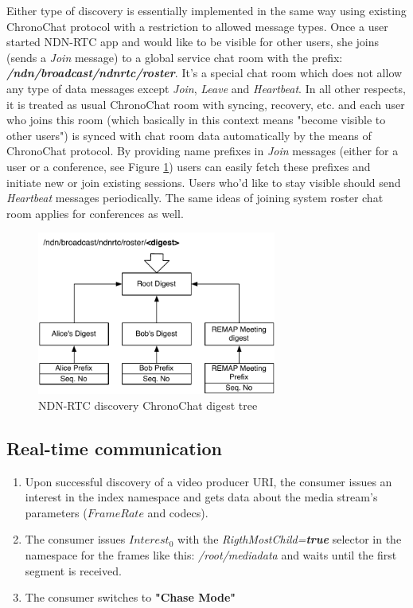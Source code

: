 \documentclass[12pt]{article}
\begin{document}
Either type of discovery is essentially implemented in the same way using existing ChronoChat protocol with a restriction to allowed message types. Once a user started NDN-RTC app and would like to be visible for other users, she joins (sends a \textit{Join} message) to a global service chat room with the prefix: \textbf{\textit{/ndn/broadcast/ndnrtc/roster}}. It's a special chat room which does not allow any type of data messages except \textit{Join}, \textit{Leave} and \textit{Heartbeat}. In all other respects, it is treated as usual ChronoChat room with syncing, recovery, etc. and each user who joins this room (which basically in this context means "become visible to other users") is synced with chat room data automatically by the means of ChronoChat protocol. By providing name prefixes in \textit{Join} messages (either for a user or a conference, see Figure \ref{fig:tree}) users can easily fetch these prefixes and initiate new or join existing sessions. Users who'd like to stay visible should send \textit{Heartbeat} messages periodically. The same ideas of joining system roster chat room applies for conferences as well.

\begin{figure}[Ht!]
\centering
\includegraphics[width=0.7\textwidth]{../res/graphics/tree}
\caption{NDN-RTC discovery ChronoChat digest tree}
\label{fig:tree}
\end{figure}

\subsection{Real-time communication}
\label{sec:rtc}
\begin{enumerate}
\item Upon successful discovery of a video producer URI, the consumer issues an interest in the index namespace and gets data about the media stream's parameters ($FrameRate$ and codecs).
\item The consumer issues $Interest_{0}$ with the \textit{RigthMostChild=\textbf{true}} selector in the namespace for the frames like this: \textit{/root/mediadata} and waits until the first segment is received.
\item The consumer switches to \textbf{"Chase Mode"}
\end{enumerate}
\end{document}
